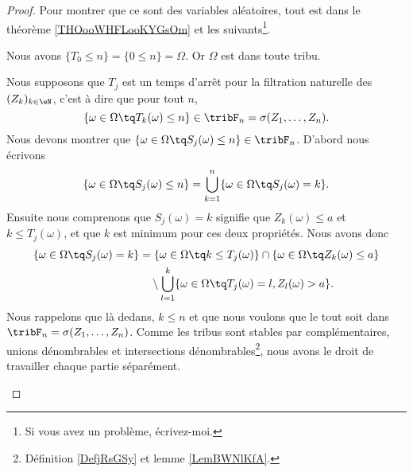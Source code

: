 \begin{proof}
	Pour montrer que ce sont des variables aléatoires, tout est dans le théorème \ref{THOooWHFLooKYGsOm} et les suivants\footnote{Si vous avez un problème, écrivez-moi.}.

	\begin{subproof}

		Nous avons \( \{ T_0\leq n \}=\{ 0\leq n \}=\Omega\). Or \( \Omega\) est dans toute tribu.


		Nous supposons que \( T_j\) est un temps d'arrêt pour la filtration naturelle des \( (Z_k)_{k\in \eN}\), c'est à dire que pour tout \( n\),
		\begin{equation}
			\{ \omega\in \Omega\tq T_k(\omega)\leq n \}\in\tribF_n=\sigma(Z_1,\ldots,Z_n).
		\end{equation}
		Nous devons montrer que \( \{ \omega\in\Omega\tq S_j(\omega)\leq n \}\in\tribF_n\). D'abord nous écrivons
		\begin{equation}		\label{EQooHBWRooGhAIan}
			\{ \omega\in\Omega\tq S_j(\omega)\leq n \}=\bigcup_{k=1}^n\{ \omega\in \Omega\tq S_j(\omega)=k \}.
		\end{equation}
		Ensuite nous comprenons que \( S_j(\omega)=k\) signifie que \( Z_k(\omega)\leq a\) et \( k\leq T_j(\omega)\), et que \( k\) est minimum pour ces deux propriétés. Nous avons donc
		\begin{equation}
			\begin{aligned}[]
				\{ \omega\in \Omega\tq S_j(\omega)=k \} & =\{ \omega\in \Omega\tq k\leq T_j(\omega) \}\cap\{ \omega\in\Omega\tq Z_k(\omega)\leq a \} \\
				                                        & \quad\setminus \bigcup_{l=1}^k\{ \omega\in \Omega\tq T_j(\omega)=l,Z_l(\omega)>a \}.
			\end{aligned}
		\end{equation}
		Nous rappelons que là dedans, \( k\leq n\) et que nous voulons que le tout soit dans \( \tribF_n=\sigma(Z_1,\ldots,Z_n)\). Comme les tribus sont stables par complémentaires, unions dénombrables et intersections dénombrables\footnote{Définition \ref{DefjRsGSy} et lemme \ref{LemBWNlKfA}.}, nous avons le droit de travailler chaque partie séparément.


\end{subproof}
\end{proof}
